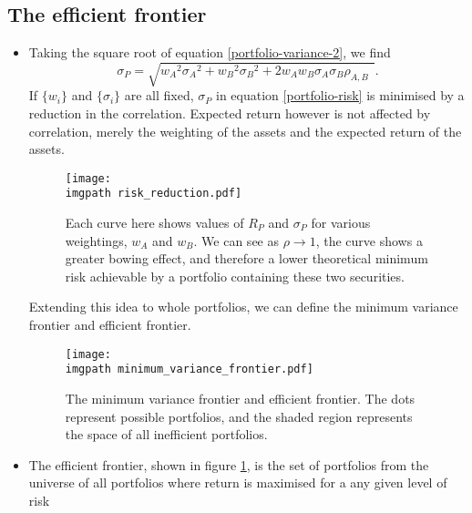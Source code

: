 \documentclass[../notes_compiled.tex]{subfiles}
\begin{document}
\subsection{The efficient frontier}
\begin{itemize}
\item Taking the square root of equation \ref{portfolio-variance-2}, we find
\begin{equation}
\sigma_{P} = \sqrt{{w_{A}}^{2}{\sigma_{A}}^{2} + {w_{B}}^{2}{\sigma_{B}}^{2} + 2w_{A}w_{B}\sigma_{A}\sigma_{B}\rho_{A,B}\phantom{,}}. \label{portfolio-risk}
\end{equation}
If $\{w_{i}\}$ and $\{\sigma_{i}\}$ are all fixed, $\sigma_{P}$ in equation \ref{portfolio-risk} is minimised by a reduction in the correlation. Expected return however is not affected by correlation, merely the weighting of the assets and the expected return of the assets.
\begin{figure}[h]
  \centering
  \texttt{[image: \\imgpath risk\_reduction.pdf]}
  \caption{Each curve here shows values of $R_{P}$ and $\sigma_{P}$ for various weightings, $w_{A}$ and $w_{B}$. We can see as $\rho\rightarrow1$, the curve shows a greater bowing effect, and therefore a lower theoretical minimum risk achievable by a portfolio containing these two securities.}
\end{figure}

Extending this idea to whole portfolios, we can define the minimum variance frontier and efficient frontier.
\begin{figure}[h]
  \centering
  \texttt{[image: \\imgpath minimum\_variance\_frontier.pdf]}
  \caption{The minimum variance frontier and efficient frontier. The dots represent possible portfolios, and the shaded region represents the space of all inefficient portfolios.}
  \label{efficient-frontier}
\end{figure}
\item The efficient frontier, shown in figure \ref{efficient-frontier}, is the set of portfolios from the universe of all portfolios where return is maximised for a any given level of risk
\end{itemize}
\end{document}
